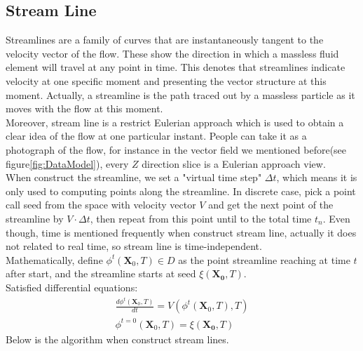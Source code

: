 \documentclass[
     11pt,         %
     a4paper,      %
     oneside,
     ]{article}
\newcommand{\vect}[1]{\boldsymbol{#1}}
\begin{document}
	\subsection{Stream  Line}
	Streamlines are a family of curves that are instantaneously tangent to the velocity vector of the flow. These show the direction in which a massless fluid element will travel at any point in time\cite{StreamlineDefine}. This denotes that streamlines indicate velocity at one specific moment and presenting the vector structure at this moment. Actually, a streamline is the path traced out by a massless particle as it moves with the flow at this moment.\\
	Moreover, stream line is a restrict Eulerian approach which is used to obtain a clear idea of the flow at one particular instant. People can take it as a photograph of the flow, for instance in the vector field we mentioned before(see figure\ref{fig:DataModel}), every $Z$ direction slice is a Eulerian approach view.\\
	When construct the streamline, we set a "virtual time step" $\Delta t$, which means it is only used to computing points along the streamline. In discrete case, pick a point call seed from the space with velocity vector $V$ and get the next point of the streamline by $V\cdot\Delta t$, then repeat from this point until to the total time $t_{n}$. Even though, time is mentioned frequently when construct stream line, actually it does not related to real time, so stream line is time-independent.\\
	Mathematically, define $\phi^{t}(\vect{X}_{0},T)\in D$ as the point streamline reaching at time $t$ after start, and the streamline starts at seed $\xi(\vect{X_{0}},T)$. \\
	Satisfied differential equations:\\
	\begin{eqnarray}
	\frac{d\phi^{t}(\vect{X}_{0},T)}{dt}=V(\phi^{t}(\vect{X}_{0},T),T)\\
	\phi^{t=0}(\vect{X}_{0},T)=\xi(\vect{X_{0}},T)
	\end{eqnarray}
	Below is the algorithm when construct stream lines.\\
\end{document}
